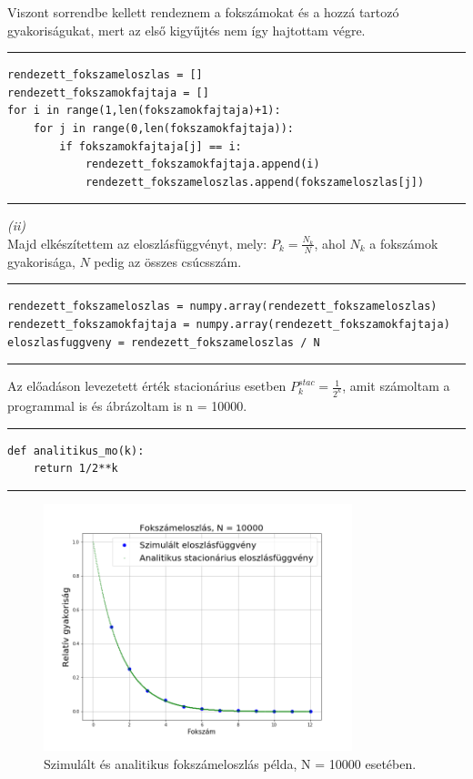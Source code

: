 \documentclass[a4paper, 12pt]{article}
\numberwithin{equation}{section}          %
\numberwithin{figure}{subsection}
\begin{document}
Viszont sorrendbe kellett rendeznem a fokszámokat és a hozzá tartozó gyakoriságukat, mert az első kigyűjtés nem így hajtottam végre.\newline
\rule{\textwidth}{0.1pt}
\begin{lstlisting}
rendezett_fokszameloszlas = []
rendezett_fokszamokfajtaja = []
for i in range(1,len(fokszamokfajtaja)+1):
	for j in range(0,len(fokszamokfajtaja)):
		if fokszamokfajtaja[j] == i:
			rendezett_fokszamokfajtaja.append(i)
			rendezett_fokszameloszlas.append(fokszameloszlas[j])
\end{lstlisting}
\rule{\textwidth}{0.1pt}
\textit{(ii)}\\
Majd elkészítettem az eloszlásfüggvényt, mely: $P_k = \frac{N_k}{N}$, ahol $N_k$ a fokszámok gyakorisága, $N$ pedig az összes csúcsszám.\newline
\rule{\textwidth}{0.1pt}
\begin{lstlisting}
rendezett_fokszameloszlas = numpy.array(rendezett_fokszameloszlas)
rendezett_fokszamokfajtaja = numpy.array(rendezett_fokszamokfajtaja)
eloszlasfuggveny = rendezett_fokszameloszlas / N
\end{lstlisting}
\rule{\textwidth}{0.1pt}

Az előadáson levezetett érték stacionárius esetben $P_k^{stac} = \frac{1}{2^k}$, amit számoltam a programmal is és ábrázoltam is n = 10000.\newline
\rule{\textwidth}{0.1pt}
\begin{lstlisting}
def analitikus_mo(k):
	return 1/2**k
\end{lstlisting}
\rule{\textwidth}{0.1pt}

\begin{figure}[h!]
	\begin{center}
		\includegraphics[width=0.8\textwidth]{fokszameloszlas.png}
	\end{center}
\caption{Szimulált és analitikus fokszámeloszlás példa, N = 10000 esetében.}
\end{figure}
\end{document}
